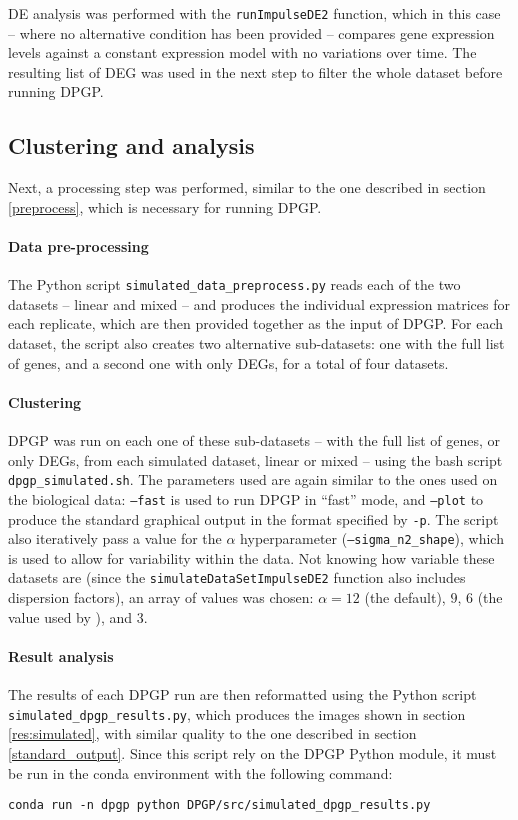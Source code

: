 DE analysis was performed with the \texttt{runImpulseDE2} function, which in this case -- where no alternative condition has been provided -- compares gene expression levels against a constant expression model with no variations over time. The resulting list of DEG was used in the next step to filter the whole dataset before running DPGP.

\subsection{Clustering and analysis}
Next, a processing step was performed, similar to the one described in section \ref{preprocess}, which is necessary for running DPGP.
\paragraph{Data pre-processing}
The Python script \texttt{simulated\_data\_preprocess.py} reads each of the two datasets -- linear and mixed -- and produces the individual expression matrices for each replicate, which are then provided together as the input of DPGP. For each dataset, the script also creates two alternative sub-datasets: one with the full list of genes, and a second one with only DEGs, for a total of four datasets.

\paragraph{Clustering}
DPGP was run on each one of these sub-datasets -- with the full list of genes, or only DEGs, from each simulated dataset, linear or mixed -- using the bash script \texttt{dpgp\_simulated.sh}. The parameters used are again similar to the ones used on the biological data: \texttt{--fast} is used to run DPGP in ``fast'' mode, and \texttt{--plot} to produce the standard graphical output in the format specified by \texttt{-p}. The script also iteratively pass a value for the $\alpha$ hyperparameter (\texttt{--sigma\_n2\_shape}), which is used to allow for variability within the data. Not knowing how variable these datasets are (since the \texttt{simulateDataSetImpulseDE2} function also includes dispersion factors), an array of values was chosen: $\alpha=12$ (the default), $9$, $6$ (the value used by \citeauthor{mcdowellClusteringGeneExpression2018}), and $3$.

\paragraph{Result analysis}
The results of each DPGP run are then reformatted using the Python script \texttt{simu\-lated\_dpgp\_results.py}, which produces the images shown in section \ref{res:simulated}, with similar quality to the one described in section \ref{standard_output}. Since this script rely on the DPGP Python module, it must be run in the conda environment with the following command:
\begin{verbatim}
conda run -n dpgp python DPGP/src/simulated_dpgp_results.py      
\end{verbatim}

